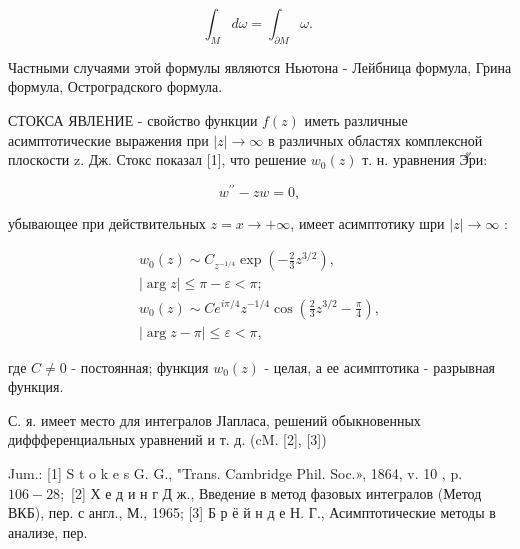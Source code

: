 \documentclass[10pt]{article}
\begin{document}
\[

\int_{M} d \omega=\int_{\partial M} \omega \text {. }

\]



Частными случаями этой формулы являются Ньютона - Лейбница формула, Грина формула, Остроградского формула.



СТОКСА ЯВЛЕНИЕ - свойство функции $f(z)$ иметь различные асимптотические выражения при $|z| \rightarrow \infty$ в различных областях комплексной плоскости z. Дж. Стокс показал [1], что решение $w_{0}(z)$ т. н. уравнения Эั̆ри:



\[

w^{\prime \prime}-z w=0,

\]



убывающее при действительных $z=x \rightarrow+\infty$, имеет асимптотику шри $|z| \rightarrow \infty$ :



\[

\begin{gathered}

w_{0}(z) \sim C_{z^{-1 / 4}} \exp \left(-\frac{2}{3} z^{3 / 2}\right), \\

|\arg z| \leqslant \pi-\varepsilon<\pi ; \\

w_{0}(z) \sim C e^{i \pi / 4} z^{-1 / 4} \cos \left(\frac{2}{3} z^{3 / 2}-\frac{\pi}{4}\right), \\

|\arg z-\pi| \leqslant \varepsilon<\pi,

\end{gathered}

\]



где $C \neq 0$ - постоянная; функция $w_{0}(z)$ - целая, а ее асимптотика - разрывная функция.



С. я. имеет место для интегралов ЈІапласа, решений обыкновенных диффференциальных уравнений и т. д. (cM. [2], [3])



Jum.: [1] S t o k e s G. G., "Trans. Cambridge Phil. Soc.», 1864, v. 10 , p. $106-28 ;$ [2] Х е д и н г Д ж., Введение в метод фазовых интегралов (Метод ВКБ), пер. с англ., М., 1965; [3] Б р ё й н д е Н. Г., Асимптотические методы в анализе, пер.
\end{document}
